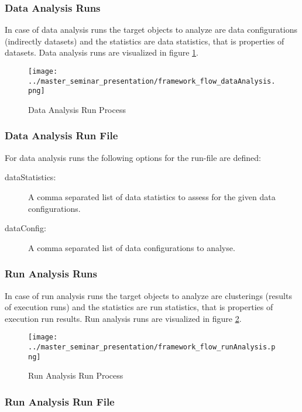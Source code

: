 		\subsubsection{Data Analysis Runs} \label{dataAnalysis_runs}		
			In case of data analysis runs the target objects to analyze are data configurations (indirectly datasets) and the statistics are data statistics, that is properties of datasets. Data analysis runs are visualized in figure \ref{dataAnalysis_run_process}.
		
		\begin{figure}[hbtp]
		\caption{Data Analysis Run Process}
		\label{dataAnalysis_run_process}
		\centering
		\texttt{[image: ../master\_seminar\_presentation/framework\_flow\_dataAnalysis.png]}
		\end{figure}
		
		\subsubsection{Data Analysis Run File}\label{dataAnalysis_run_file}

		For data analysis runs the following options for the run-file are defined:
		 \begin{description}
		 	\item[dataStatistics:] A comma separated list of data statistics to assess for the given data configurations.
		 	\item[dataConfig:] A comma separated list of data configurations to analyse.
		 \end{description}
			
		
		\subsubsection{Run Analysis Runs} \label{runAnalysis_runs}		
			In case of run analysis runs the target objects to analyze are clusterings (results of execution runs) and the statistics are run statistics, that is properties of execution run results. Run analysis runs are visualized in figure \ref{runAnalysis_run_process}.
		
		\begin{figure}[hbtp]
		\caption{Run Analysis Run Process}
		\label{runAnalysis_run_process}
		\centering
		\texttt{[image: ../master\_seminar\_presentation/framework\_flow\_runAnalysis.png]}
		\end{figure}
		
		\subsubsection{Run Analysis Run File}\label{runAnalysis_run_file}

